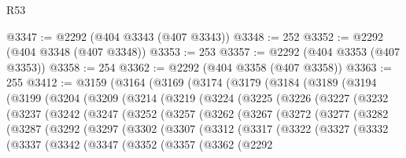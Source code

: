 \begin{lexlean}{R53}
\begin{coremodule}
@3347 := @2292 (@404 @3343 (@407 @3343))
@3348 := 252
@3352 := @2292 (@404 @3348 (@407 @3348))
@3353 := 253
@3357 := @2292 (@404 @3353 (@407 @3353))
@3358 := 254
@3362 := @2292 (@404 @3358 (@407 @3358))
@3363 := 255
@3412 := @3159
    (@3164
      (@3169
        (@3174
          (@3179
            (@3184
              (@3189
                (@3194
                  (@3199
                    (@3204
                      (@3209
                        (@3214
                          (@3219
                            (@3224
                              (@3225
                                (@3226
                                  (@3227
                                    (@3232
                                      (@3237
                                        (@3242
                                          (@3247
                                            (@3252
                                              (@3257
                                                (@3262
                                                  (@3267
                                                    (@3272
                                                      (@3277
                                                        (@3282
                                                          (@3287
                                                            (@3292
                                                              (@3297
                                                                (@3302
                                                                  (@3307
                                                                    (@3312
                                                                      (@3317
                                                                        (@3322
                                                                          (@3327
                                                                            (@3332
                                                                              (@3337
                                                                                (@3342
                                                                                  (@3347
                                                                                    (@3352
                                                                                      (@3357
                                                                                        (@3362
                                                                                          (@2292

\end{coremodule}
\end{lexlean}

